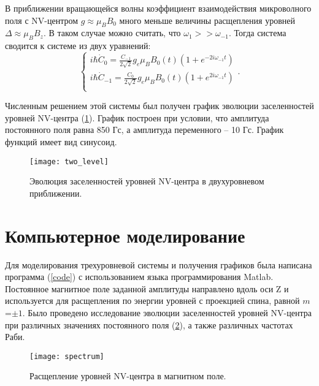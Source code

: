 В приближении вращающейся волны коэффициент взаимодействия
микроволного поля с NV-центром $g \approx \mu_B B_0$ много меньше
величины расщепления уровней $\Delta \approx \mu_B B_z$. В таком
случае можно
считать, что $\omega_1 >> \omega_{-1}$. Тогда система сводится к системе из двух уравнений:
\begin{equation*}
\begin{cases} 
  i \hbar \dot{C}_0 = \frac{C_{-1}}{2 \sqrt{2}} g_e \mu_B
  B_0(t) ( 1 + e^{-2 i \omega_{-1} t} )\\
  i \hbar \dot{C}_{-1} = \frac{C_0}{2 \sqrt{2}} g_e \mu_B B_0(t) ( 1 +
  e^{2 i \omega_{-1}t})\\
\end{cases}.
\end{equation*}

Численным решением этой системы был получен график эволюции
заселенностей уровней NV-центра (\ref{fig:two_level}). График построен
при условии, что амплитуда постоянного поля равна 850 Гс, а амплитуда
переменного -- 10 Гс. График функций
имеет вид синусоид.
\begin{figure}[H]\centering
  \texttt{[image: two\_level]}
  \caption{Эволюция заселенностей уровней NV-центра в двухуровневом приближении.}\label{fig:two_level}
\end{figure}


\section{Компьютерное моделирование}
Для моделирования трехуровневой системы и получения графиков была
написана программа (\ref{code}) с использованием языка программирования
Matlab. Постоянное магнитное поле заданной амплитуды направлено вдоль
оси Z и используется для расщепления по энергии уровней с проекцией
спина, равной $m$=$\pm1$. Было проведено исследование эволюции
заселенностей уровней NV-центра при различных значениях постоянного
поля (\ref{fig:spectrum}), а также различных частотах Раби.
\begin{figure}[H]\centering
  \texttt{[image: spectrum]}
  \caption{Расщепление уровней NV-центра в магнитном поле.}\label{fig:spectrum}
\end{figure}


